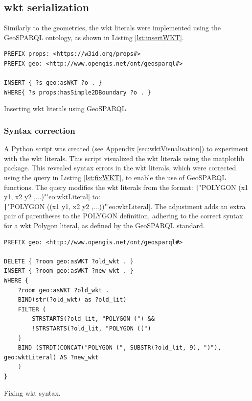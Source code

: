 \subsection{\acs{wkt} serialization}

Similarly to the geometries, the \ac{wkt} literals were implemented using the GeoSPARQL ontology, as shown in Listing \ref{lst:insertWKT}.

\begin{listing}[H]
    \begin{verbatim}
PREFIX props: <https://w3id.org/props#>
PREFIX geo: <http://www.opengis.net/ont/geosparql#>

INSERT { ?s geo:asWKT ?o . }
WHERE{ ?s props:hasSimple2DBoundary ?o . }
    \end{verbatim}
    \caption[Inserting \acs{wkt} literals]{Inserting \acs{wkt} literals using GeoSPARQL.}
    \label{lst:insertWKT}
\end{listing}

\subsubsection{Syntax correction}

A Python script was created (see Appendix \ref{sec:wktVisualisation}) to experiment with the \ac{wkt} literals. This script visualized the \ac{wkt} literals using the matplotlib package. This revealed syntax errors in the \ac{wkt} literals, which were corrected using the query in Listing \ref{lst:fixWKT}, to enable the use of GeoSPARQL functions. The query modifies the \ac{wkt} literals from the format: \texttt|"POLYGON (x1 y1, x2 y2 ,...)"^^geo:wktLiteral| to:\\
\texttt|"POLYGON ((x1 y1, x2 y2 ,...))"^^geo:wktLiteral|. The adjustment adds an extra pair of parentheses to the POLYGON definition, adhering to the correct syntax for a \ac{wkt} Polygon literal, as defined by the GeoSPARQL standard.

\begin{listing}[H]
    \begin{verbatim}
PREFIX geo: <http://www.opengis.net/ont/geosparql#>

DELETE { ?room geo:asWKT ?old_wkt . }
INSERT { ?room geo:asWKT ?new_wkt . }
WHERE {
    ?room geo:asWKT ?old_wkt .
    BIND(str(?old_wkt) as ?old_lit)
    FILTER (
        STRSTARTS(?old_lit, "POLYGON (") &&
        !STRSTARTS(?old_lit, "POLYGON ((")
    )
    BIND (STRDT(CONCAT("POLYGON (", SUBSTR(?old_lit, 9), ")"), geo:wktLiteral) AS ?new_wkt
    )
}
    \end{verbatim}
    \caption{Fixing \acs{wkt} syntax.}
    \label{lst:fixWKT}
\end{listing}

